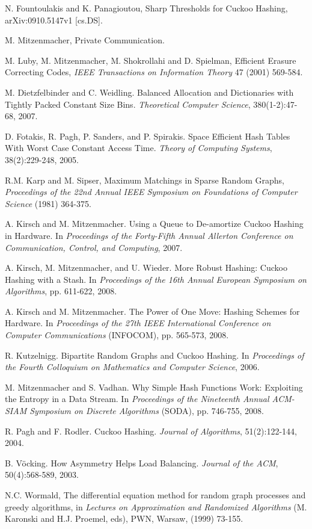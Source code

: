 \documentclass[11pt]{article}
\begin{document}
\begin{thebibliography}{100}
 N. Fountoulakis and K. Panagioutou, Sharp Thresholds for Cuckoo Hashing, arXiv:0910.5147v1 [cs.DS].

 M. Mitzenmacher, Private Communication.

 M. Luby, M. Mitzenmacher, M. Shokrollahi and D. Spielman, 
Efficient Erasure Correcting Codes, {\em IEEE Transactions on Information Theory} 47 (2001) 569-584.

 M. Dietzfelbinder and C. Weidling.  Balanced Allocation
    and Dictionaries with Tightly Packed Constant Size Bins.
    \emph{Theoretical Computer Science}, 380(1-2):47-68, 2007.

 D. Fotakis, R. Pagh, P. Sanders, and P. Spirakis.
    Space Efficient Hash Tables With Worst Case Constant Access Time.
    \emph{Theory of Computing Systems}, 38(2):229-248, 2005.

 R.M. Karp and M. Sipser, Maximum Matchings in Sparse Random Graphs,
{\em Proceedings of the 22nd Annual IEEE Symposium on Foundations of Computer Science} (1981) 364-375.


 A. Kirsch and M. Mitzenmacher. Using a Queue to
    De-amortize Cuckoo Hashing in Hardware. In \emph{Proceedings of the
    Forty-Fifth Annual Allerton Conference on Communication, Control, and
    Computing}, 2007.

 A. Kirsch, M. Mitzenmacher, and U. Wieder.  More
    Robust Hashing: Cuckoo Hashing with a Stash.  In
    \emph{Proceedings of the 16th Annual European Symposium on
    Algorithms}, pp. 611-622, 2008.

 A. Kirsch and M. Mitzenmacher. The Power of One
    Move: Hashing Schemes for Hardware. In \emph{Proceedings of the
    27th IEEE International Conference on Computer Communications}
    (INFOCOM), pp. 565-573, 2008.

 R. Kutzelnigg.  Bipartite Random Graphs and Cuckoo
    Hashing. In \emph{Proceedings of the Fourth Colloquium on
    Mathematics and Computer Science}, 2006.

 M. Mitzenmacher and S. Vadhan. Why Simple Hash
    Functions Work: Exploiting the Entropy in a Data Stream. In
    \emph{Proceedings of the Nineteenth Annual ACM-SIAM Symposium on
    Discrete Algorithms} (SODA), pp. 746-755, 2008.

 R. Pagh and F. Rodler. Cuckoo Hashing. \emph{Journal
    of Algorithms}, 51(2):122-144, 2004.

 B. V\"{o}cking.  How Asymmetry Helps Load Balancing.
    \emph{Journal of the ACM}, 50(4):568-589, 2003.

 N.C. Wormald, The differential equation method for random graph processes and greedy algorithms,
in  {\em Lectures on Approximation and Randomized Algorithms} (M. Karonski and H.J. Proemel, eds), PWN, Warsaw, (1999) 73-155.

\end{thebibliography}
\end{document}
